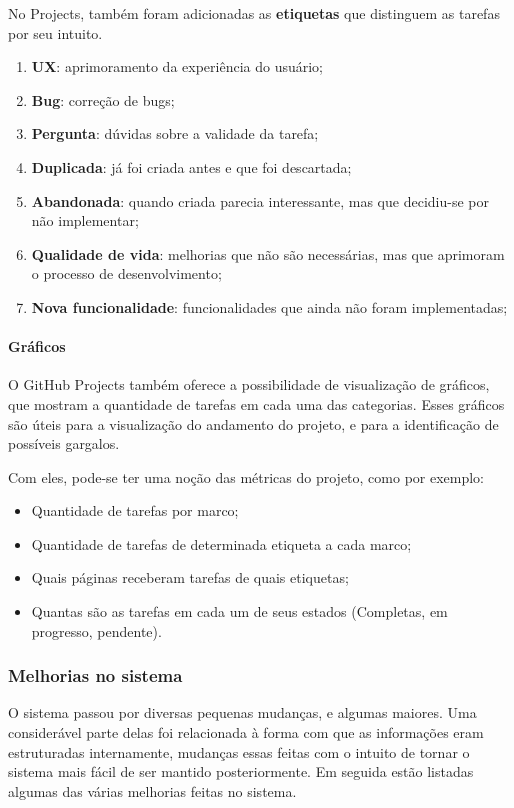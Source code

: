 No Projects, também foram adicionadas as \textbf{etiquetas} que distinguem as tarefas por seu intuito.

\begin{enumerate}
  \item \textbf{UX}: aprimoramento da experiência do usuário;
  \item \textbf{Bug}: correção de bugs;
  \item \textbf{Pergunta}: dúvidas sobre a validade da tarefa;
  \item \textbf{Duplicada}: já foi criada antes e que foi descartada;
  \item \textbf{Abandonada}: quando criada parecia interessante, mas que decidiu-se por não implementar;
  \item \textbf{Qualidade de vida}: melhorias que não são necessárias, mas que aprimoram o processo de desenvolvimento;
  \item \textbf{Nova funcionalidade}: funcionalidades que ainda não foram implementadas;
\end{enumerate}

\paragraph*{Gráficos}

O GitHub Projects também oferece a possibilidade de visualização de gráficos, que mostram a quantidade de tarefas em cada uma das categorias. Esses gráficos são úteis para a visualização do andamento do projeto, e para a identificação de possíveis gargalos.

Com eles, pode-se ter uma noção das métricas do projeto, como por exemplo:

\begin{itemize}
  \item Quantidade de tarefas por marco;
  \item Quantidade de tarefas de determinada etiqueta a cada marco;
  \item Quais páginas receberam tarefas de quais etiquetas;
  \item Quantas são as tarefas em cada um de seus estados (Completas, em progresso, pendente).
\end{itemize}

\subsubsection{Melhorias no sistema}

O sistema passou por diversas pequenas mudanças, e algumas maiores. Uma considerável parte delas foi relacionada à forma com que as informações eram estruturadas internamente, mudanças essas feitas com o intuito de tornar o sistema mais fácil de ser mantido posteriormente. Em seguida estão listadas algumas das várias melhorias feitas no sistema.

